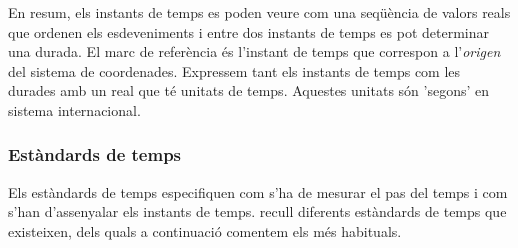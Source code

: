 


En resum, els instants de temps es poden veure com una seqüència de
valors reals que ordenen els esdeveniments i entre dos instants de
temps es pot determinar una durada.  El marc de referència és
l'instant de temps que correspon a l'\emph{origen} del sistema de
coordenades.  Expressem tant els instants de temps com les durades amb
un real que té unitats de temps. Aquestes unitats són 'segons' en
sistema internacional.



\subsubsection{Estàndards de temps}

Els estàndards de temps especifiquen com s'ha de mesurar el pas del
temps i com s'han d'assenyalar els instants de temps.
\textcite{allen:timescales} recull diferents estàndards de temps
que existeixen, dels quals a continuació comentem els més habituals.

